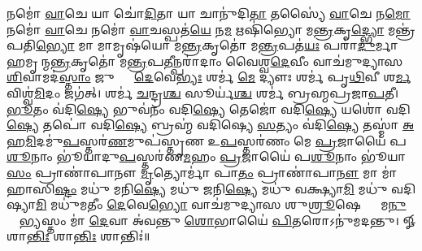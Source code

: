 𑌨𑌮𑍋॑ \ul{𑌵𑌾}𑌚𑍇 𑌯𑌾 𑌚𑍋॑\ul{𑌦𑌿}𑌤𑌾 𑌯𑌾 𑌚𑌾𑌨𑍁॑𑌦𑌿\ul{𑌤𑌾} 𑌤𑌸𑍍𑌯𑍈॑ \ul{𑌵𑌾}𑌚𑍇 𑌨\ul{𑌮𑍋} 𑌨𑌮𑍋॑ \ul{𑌵𑌾}𑌚𑍇 𑌨𑌮𑍋॑ \ul{𑌵𑌾}𑌚𑌸𑍍𑌪𑌤॑\ul{𑌯𑍇} 𑌨\ul{𑌮} 𑌋𑌷𑌿॑𑌭𑍍𑌯𑍋 𑌮\ul{𑌨𑍍𑌤𑍍𑌰}𑌕𑍃\ul{𑌦𑍍𑌭𑍍𑌯𑍋} 𑌮𑌨𑍍𑌤𑍍𑌰॑𑌪𑌤𑌿\ul{𑌭𑍍𑌯𑍋} 𑌮𑌾 𑌮𑌾𑌮𑍃𑌷॑𑌯𑍋 𑌮\ul{𑌨𑍍𑌤𑍍𑌰}𑌕𑍃𑌤𑍋॑ 𑌮\ul{𑌨𑍍𑌤𑍍𑌰}𑌪𑌤॑\ul{𑌯𑌃} 𑌪𑌰𑌾॑\ul{𑌦𑍁}𑌰𑍍𑌮𑌾𑌹𑌮𑍃𑌷𑍀᳚𑌨𑍍𑌮\ul{𑌨𑍍𑌤𑍍𑌰}𑌕𑍃𑌤𑍋॑ 𑌮\ul{𑌨𑍍𑌤𑍍𑌰}𑌪\ul{𑌤𑍀}𑌨𑍍𑌪𑌰𑌾॑𑌦𑌾𑌂 𑌵𑍈𑌶𑍍𑌵\ul{𑌦𑍇}𑌵𑍀𑌂 𑌵𑌾𑌚॑𑌮𑍁𑌦𑍍𑌯𑌾𑌸 \ul{𑌶𑌿}𑌵𑌾𑌮𑌦॑\ul{𑌸𑍍𑌤𑌾𑌂} 𑌜𑍁𑌷𑍍𑌟𑌾𑌂᳚ \ul{𑌦𑍇}𑌵𑍇\ul{𑌭𑍍𑌯𑌃} 𑌶𑌰𑍍𑌮॑ \ul{𑌮𑍇} 𑌦𑍍𑌯𑍗𑌃  𑌶𑌰𑍍𑌮॑ 𑌪𑍃\ul{𑌥𑌿}𑌵𑍀 𑌶\ul{𑌰𑍍𑌮} 𑌵𑌿𑌶𑍍𑌵॑\ul{𑌮𑌿}𑌦𑌂 𑌜𑌗॑𑌤𑍍। 
𑌶𑌰𑍍𑌮॑ \ul{𑌚}𑌨𑍍𑌦𑍍𑌰\ul{𑌶𑍍𑌚} 𑌸𑍂𑌰𑍍𑌯॑\ul{𑌶𑍍𑌚} 𑌶𑌰𑍍𑌮॑ 𑌬𑍍𑌰𑌹𑍍𑌮𑌪𑍍𑌰𑌜𑌾\ul{𑌪}𑌤𑍀। 
\ul{𑌭𑍂}𑌤𑌂 𑌵॑𑌦𑌿\ul{𑌷𑍍𑌯𑍇} 𑌭𑍁𑌵॑𑌨𑌂 𑌵𑌦𑌿\ul{𑌷𑍍𑌯𑍇} 𑌤𑍇𑌜𑍋॑ 𑌵𑌦𑌿\ul{𑌷𑍍𑌯𑍇} 𑌯𑌶𑍋॑ 𑌵𑌦𑌿\ul{𑌷𑍍𑌯𑍇} 𑌤𑌪𑍋॑ 𑌵𑌦𑌿\ul{𑌷𑍍𑌯𑍇} 𑌬𑍍𑌰𑌹𑍍𑌮॑ 𑌵𑌦𑌿𑌷𑍍𑌯𑍇 \ul{𑌸}𑌤𑍍𑌯𑌂 𑌵॑𑌦𑌿\ul{𑌷𑍍𑌯𑍇} 𑌤𑌸𑍍𑌮𑌾॑ \ul{𑌅}𑌹\ul{𑌮𑌿}𑌦𑌮𑍁॑\ul{𑌪}𑌸𑍍𑌤𑌰॑\ul{𑌣}𑌮𑍁𑌪॑𑌸𑍍𑌤𑍃𑌣 𑌉\ul{𑌪}𑌸𑍍𑌤𑌰॑𑌣𑌂 𑌮𑍇 \ul{𑌪𑍍𑌰}𑌜𑌾𑌯𑍈॑ 𑌪\ul{𑌶𑍂}𑌨𑌾𑌂 𑌭𑍂॑𑌯𑌾𑌦𑍁\ul{𑌪}𑌸𑍍𑌤𑌰॑𑌣\ul{𑌮}𑌹𑌂 \ul{𑌪𑍍𑌰}𑌜𑌾𑌯𑍈॑ 𑌪\ul{𑌶𑍂}𑌨𑌾𑌂 𑌭𑍂॑𑌯𑌾\ul{𑌸𑌂} 𑌪𑍍𑌰𑌾𑌣𑌾॑𑌪𑌾𑌨𑍗 \ul{𑌮𑍃}𑌤𑍍𑌯𑍋𑌰𑍍𑌮𑌾॑ 𑌪𑌾\ul{𑌤𑌂} 𑌪𑍍𑌰𑌾𑌣𑌾॑𑌪𑌾\ul{𑌨𑍗} 𑌮𑌾 𑌮𑌾॑ 𑌹𑌾𑌸𑌿\ul{𑌷𑍍𑌟𑌂} 𑌮𑌧𑍁॑ 𑌮𑌨𑌿\ul{𑌷𑍍𑌯𑍇} 𑌮𑌧𑍁॑ 𑌜𑌨𑌿\ul{𑌷𑍍𑌯𑍇} 𑌮𑌧𑍁॑ 𑌵𑌕𑍍𑌷𑍍𑌯𑌾\ul{𑌮𑌿} 𑌮𑌧𑍁॑ 𑌵𑌦𑌿𑌷𑍍𑌯𑌾\ul{𑌮𑌿} 𑌮𑌧𑍁॑𑌮𑌤𑍀𑌂 \ul{𑌦𑍇}𑌵𑍇\ul{𑌭𑍍𑌯𑍋} 𑌵𑌾𑌚॑𑌮𑍁𑌦𑍍𑌯𑌾𑌸 𑌶𑍁\ul{𑌶𑍍𑌰𑍂}𑌷𑍇𑌣𑍍𑌯𑌾𑌂᳚ 𑌮\ul{𑌨𑍁}𑌷𑍍𑌯𑍇᳚\ul{𑌭𑍍𑌯}𑌸𑍍𑌤𑌂 𑌮𑌾॑ \ul{𑌦𑍇}𑌵𑌾 𑌅॑𑌵𑌨𑍍𑌤𑍁 \ul{𑌶𑍋}𑌭𑌾𑌯𑍈॑ \ul{𑌪𑌿}𑌤𑌰𑍋𑌽𑌨𑍁॑𑌮𑌦𑌨𑍍𑌤𑍁। 
𑍐 𑌶𑌾\ul{𑌨𑍍𑌤𑌿𑌃} 𑌶𑌾\ul{𑌨𑍍𑌤𑌿𑌃} 𑌶𑌾𑌨𑍍𑌤𑌿𑌃॑॥ 

\closesection
